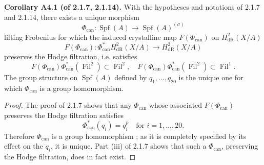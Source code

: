 \documentclass[12pt,a4paper]{article}
\theoremstyle{plain}
\theoremstyle{definition}
\theoremstyle{remark}
\DeclareMathOperator{\Fil}{Fil}
\DeclareMathOperator{\Spf}{Spf}
\begin{document}
\textbf{Corollary A4.1 (of 2.1.7, 2.1.14).} With the hypotheses and notations of 2.1.7 and 2.1.14, there exists a unique morphism
\[
\Phi_{\mathrm{can}} : \Spf(A) \longrightarrow \Spf(A)^{(\sigma)}
\]
lifting Frobenius for which the induced crystalline map $F(\Phi_{\mathrm{can}})$ on $H^2_\mathrm{dR}(X/A)$
\[
F(\Phi_{\mathrm{can}}) : \Phi_{\mathrm{can}}^* H^2_\mathrm{dR}(X/A) \longrightarrow H^2_\mathrm{dR}(X/A)
\]
preserves the Hodge filtration, i.e. satisfies
\[
F(\Phi_{\mathrm{can}})\Phi_{\mathrm{can}}^*(\Fil^2) \subset \Fil^2, \quad F(\Phi_{\mathrm{can}})\Phi_{\mathrm{can}}^*(\Fil^2) \subset \Fil^1.
\]
The group structure on $\Spf(A)$ defined by $q_1, \ldots, q_{20}$ is the unique one for which $\Phi_{\mathrm{can}}$ is a group homomorphism.

\begin{proof}
The proof of 2.1.7 shows that any $\Phi_{\mathrm{can}}$ whose associated $F(\Phi_{\mathrm{can}})$ preserves the Hodge filtration satisfies
\[
\Phi_{\mathrm{can}}^*(q_i) = q_i^p \quad \text{for } i = 1, \ldots, 20.
\]
Therefore $\Phi_{\mathrm{can}}$ is a group homomorphism ; as it is completely specified by its effect on the $q_i$, it is unique. Part (iii) of 2.1.7 shows that such a $\Phi_{\mathrm{can}}$, preserving the Hodge filtration, does in fact exist. \qedhere
\end{proof}
\end{document}
